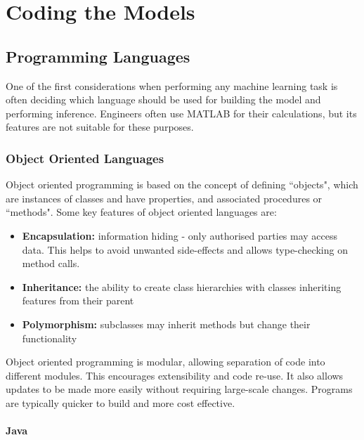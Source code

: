 \chapter{Coding the Models}\label{chap:codingTheModels}

\section{Programming Languages}

One of the first considerations when performing any machine learning task is often deciding which language should be used for building the model and performing inference. Engineers often use MATLAB for their calculations, but its features are not suitable for these purposes.

\subsection{Object Oriented Languages}

Object oriented programming is based on the concept of defining ``objects", which are instances of classes and have properties, and associated procedures or ``methods". Some key features of object oriented languages are:

\begin{itemize}

\item \textbf{Encapsulation:} information hiding - only authorised parties may access data. This helps to avoid unwanted side-effects and allows type-checking on method calls.
\item \textbf{Inheritance:} the ability to create class hierarchies with classes inheriting features from their parent
\item \textbf{Polymorphism:} subclasses may inherit methods but change their functionality

\end{itemize}

Object oriented programming is modular, allowing separation of code into different modules. This encourages extensibility and code re-use. It also allows updates to be made more easily without requiring large-scale changes. Programs are typically quicker to build and more cost effective.

\subsubsection{Java}


